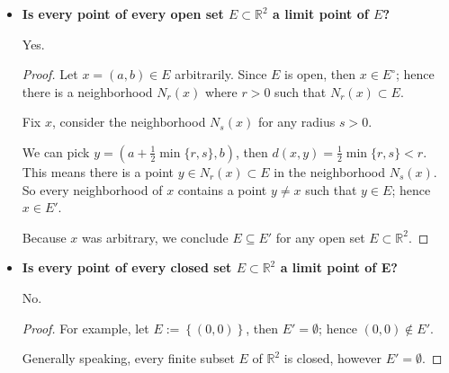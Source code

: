\begin{Exercise}
	\begin{itemize}
		\item \textbf{Is every point of every open set $E \subset \mathbb{R}^2$ a limit point of $E$?}
		\begin{answer}
			Yes.
		\end{answer}
		\begin{proof}
			Let $x = (a, b)\in E$ arbitrarily. 
			Since $E$ is open, then $x\in E^{\circ}$; hence there is a neighborhood $N_r(x)$ where $r>0$ such that $N_r(x)\subset E$.
			
			Fix $x$, consider the neighborhood $N_s(x)$ for any radius $s>0$. 
			
			We can pick $y = \left( a+\frac{1}{2}\min\{r,s\}, b \right)$, then $d(x,y) = \frac{1}{2}\min\{r,s\} < r$. 
			This means there is a point $y\in N_r(x) \subset E$ in the neighborhood $N_s(x)$. 
			So every neighborhood of $x$ contains a point $y\neq x$ such that $y\in E$; hence $x\in E'$.
			
			Because $x$ was arbitrary, we conclude $E \subseteq E'$ for any open set $E\subset \mathbb{R}^2$.
		\end{proof}
		
		\item \textbf{Is every point of every closed set $E \subset \mathbb{R}^2$ a limit point of E?}
		\begin{answer}
			No.
		\end{answer}
		\begin{proof}
			For example, let $E := \left\{ (0,0) \right\}$, then $E' = \emptyset$; hence $(0,0)\notin E'$.
			
			Generally speaking, every finite subset $E$ of $\mathbb{R}^2$ is closed, however $E' = \emptyset$. 
		\end{proof}
	\end{itemize}
\end{Exercise}